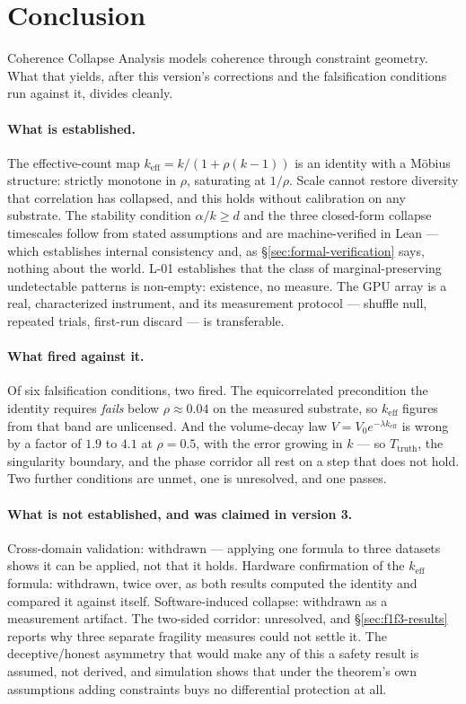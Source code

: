 \documentclass[11pt,a4paper]{article}
\theoremstyle{definition}
\theoremstyle{remark}
\newcommand{\keff}{k_{\text{eff}}}
\newcommand{\Ttruth}{T_{\text{truth}}}
\begin{document}
\section{Conclusion}

Coherence Collapse Analysis models coherence through constraint geometry. What that yields,
after this version's corrections and the falsification conditions run against it, divides
cleanly.

\paragraph{What is established.}
The effective-count map $\keff = k/(1+\rho(k-1))$ is an identity with a M\"obius structure:
strictly monotone in $\rho$, saturating at $1/\rho$. Scale cannot restore diversity that
correlation has collapsed, and this holds without calibration on any substrate. The stability
condition $\alpha/k \geq d$ and the three closed-form collapse timescales follow from stated
assumptions and are machine-verified in Lean --- which establishes internal consistency and, as
\S\ref{sec:formal-verification} says, nothing about the world. L-01 establishes that the class of
marginal-preserving undetectable patterns is non-empty: existence, no measure. The GPU array is a
real, characterized instrument, and its measurement protocol --- shuffle null, repeated trials,
first-run discard --- is transferable.

\paragraph{What fired against it.}
Of six falsification conditions, two fired. The equicorrelated precondition the identity requires
\emph{fails} below $\rho \approx 0.04$ on the measured substrate, so $\keff$ figures from that
band are unlicensed. And the volume-decay law $V = V_0 e^{-\lambda \keff}$ is wrong by a factor of
$1.9$ to $4.1$ at $\rho = 0.5$, with the error growing in $k$ --- so $\Ttruth$, the singularity
boundary, and the phase corridor all rest on a step that does not hold. Two further conditions are
unmet, one is unresolved, and one passes.

\paragraph{What is not established, and was claimed in version 3.}
Cross-domain validation: withdrawn --- applying one formula to three datasets shows it can be
applied, not that it holds. Hardware confirmation of the $\keff$ formula: withdrawn, twice over,
as both results computed the identity and compared it against itself. Software-induced collapse:
withdrawn as a measurement artifact. The two-sided corridor: unresolved, and \S\ref{sec:f1f3-results}
reports why three separate fragility measures could not settle it. The deceptive/honest asymmetry
that would make any of this a safety result is assumed, not derived, and simulation shows that
under the theorem's own assumptions adding constraints buys no differential protection at all.
\end{document}
